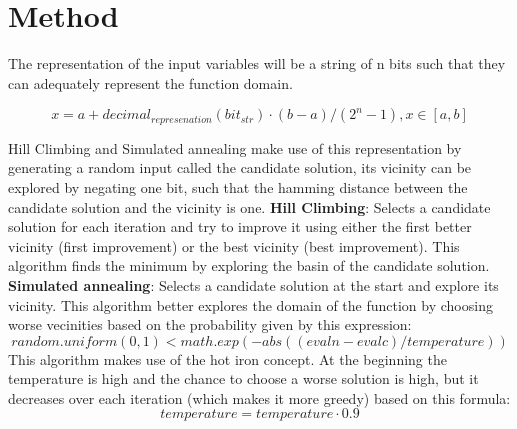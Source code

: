 \documentclass{report}
\begin{document}
\section*{Method}

The representation of the input variables will be a string of n bits such that they can adequately represent the function domain.

$$x = a + decimal_{represenation}(bit_{str}) \cdot (b - a)/(2^n - 1) ,  x \in \left[a, b \right]$$

Hill Climbing and Simulated annealing make use of this representation by generating a random input called the candidate solution, its vicinity can be explored by negating one bit, such that the hamming distance between the candidate solution and the vicinity is one.
\newline
\newline
\textbf{Hill Climbing}:
\newline
\newline
Selects a candidate solution for each iteration and try to improve it using either the first better vicinity (first improvement) or the best vicinity (best improvement). 
This algorithm finds the minimum by exploring the basin of the candidate solution.
\newline
\newline
\textbf{Simulated annealing}:
\newline
\newline
Selects a candidate solution at the start and explore its vicinity. This algorithm better explores the domain of the function by choosing worse vecinities based on the probability given by this expression:
\newline
$$random.uniform(0, 1) < math.exp(-abs((evaln - evalc) / temperature))$$
\newline
This algorithm makes use of the hot iron concept. At the beginning the temperature  is high and the chance to choose a worse solution is high, but it decreases over each iteration 
(which makes it more greedy)  based on this formula:
\newline
$$temperature = temperature \cdot 0.9$$

\pagebreak
\end{document}

